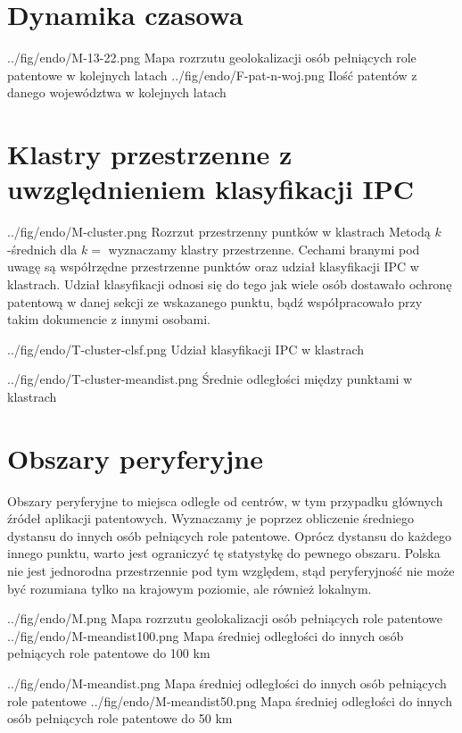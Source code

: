 \section{Dynamika czasowa}

  \figsides
{../fig/endo/M-13-22.png}
{ Mapa rozrzutu geolokalizacji osób 
  pełniących role patentowe w kolejnych latach }
{../fig/endo/F-pat-n-woj.png}
{ Ilość patentów z danego województwa w kolejnych latach }


\newpage
\section{Klastry przestrzenne z uwzględnieniem klasyfikacji \ac{IPC}}

\figside
  {../fig/endo/M-cluster.png}
    {Rozrzut przestrzenny puntków w klastrach}
{
  Metodą $k$-średnich dla $k=$ wyznaczamy klastry przestrzenne. 
  Cechami branymi pod uwagę są współrzędne przestrzenne punktów oraz
  udział klasyfikacji \ac{IPC} w klastrach. Udział klasyfikacji
  odnosi się do tego jak wiele osób dostawało ochronę patentową
  w danej sekcji ze wskazanego punktu, bądź współpracowało przy
  takim dokumencie z innymi osobami.
}

\tblside
  {../fig/endo/T-cluster-clsf.png}
    {Udział klasyfikacji \ac{IPC} w klastrach}

\tblside
  {../fig/endo/T-cluster-meandist.png}
    {Średnie odległości między punktami w klastrach}



\newpage
\section{Obszary peryferyjne}

Obszary peryferyjne to miejsca odległe od centrów, w tym przypadku
głównych źródeł aplikacji patentowych. Wyznaczamy je poprzez obliczenie
średniego dystansu do innych osób pełniących role patentowe.
Oprócz dystansu do każdego innego punktu, warto jest ograniczyć
tę statystykę do pewnego obszaru. Polska nie jest jednorodna przestrzennie 
pod tym względem, stąd peryferyjność nie może być rozumiana tylko 
na krajowym poziomie, ale również lokalnym.

\figsides
  {../fig/endo/M.png}
    {Mapa rozrzutu geolokalizacji osób pełniących role patentowe}
  {../fig/endo/M-meandist100.png}
    {Mapa średniej odległości do innych osób pełniących role patentowe do 100 km}

\figsides
  {../fig/endo/M-meandist.png}
    {Mapa średniej odległości do innych osób pełniących role patentowe}
  {../fig/endo/M-meandist50.png}
    {Mapa średniej odległości do innych osób pełniących role patentowe do 50 km}

